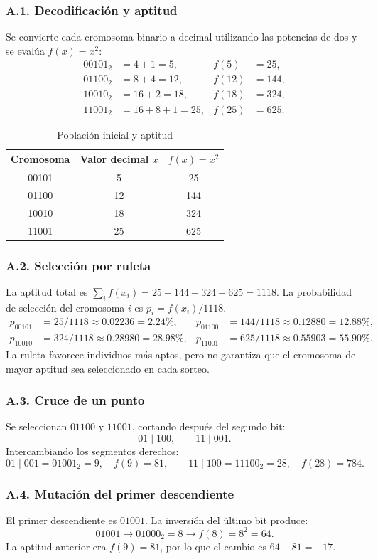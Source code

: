 \documentclass[11pt,a4paper]{article}
\begin{document}
\subsubsection{A.1. Decodificación y aptitud}
Se convierte cada cromosoma binario a decimal utilizando las potencias de dos y se evalúa $f(x)=x^2$:
\begin{align*}
00101_2&=4+1=5, & f(5)&=25,\\
01100_2&=8+4=12, & f(12)&=144,\\
10010_2&=16+2=18, & f(18)&=324,\\
11001_2&=16+8+1=25, & f(25)&=625.
\end{align*}
\begin{table}[H]\centering\caption{Población inicial y aptitud}\begin{tabular}{ccc}\toprule Cromosoma & Valor decimal $x$ & $f(x)=x^2$\\\midrule 00101 & 5 & 25\\01100 & 12 & 144\\10010 & 18 & 324\\11001 & 25 & 625\\\bottomrule\end{tabular}\end{table}
\subsubsection{A.2. Selección por ruleta}
La aptitud total es $\sum_i f(x_i)=25+144+324+625=1118$. La probabilidad de selección del cromosoma $i$ es $p_i=f(x_i)/1118$.
\begin{align*}
p_{00101}&=25/1118\approx0.02236=2.24\%,&p_{01100}&=144/1118\approx0.12880=12.88\%,\\
p_{10010}&=324/1118\approx0.28980=28.98\%,&p_{11001}&=625/1118\approx0.55903=55.90\%.
\end{align*}
La ruleta favorece individuos más aptos, pero no garantiza que el cromosoma de mayor aptitud sea seleccionado en cada sorteo.
\subsubsection{A.3. Cruce de un punto}
Se seleccionan $01100$ y $11001$, cortando después del segundo bit:
\[
01\mid100,\qquad11\mid001.
\]
Intercambiando los segmentos derechos:
\[
\boxed{01\mid001=01001_2=9,\quad f(9)=81},\qquad
\boxed{11\mid100=11100_2=28,\quad f(28)=784}.
\]
\subsubsection{A.4. Mutación del primer descendiente}
El primer descendiente es $01001$. La inversión del último bit produce:
\[
01001\longrightarrow01000_2=8\longrightarrow f(8)=8^2=64.
\]
La aptitud anterior era $f(9)=81$, por lo que el cambio es $64-81=-17$.
\end{document}
